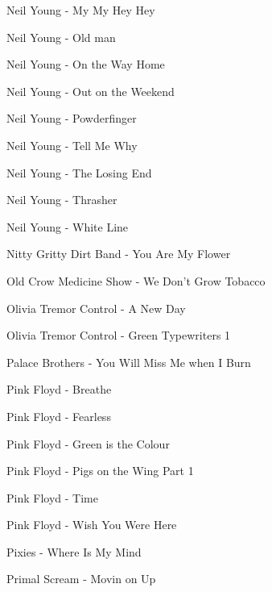 Neil Young - My My Hey Hey \dotfill \pageref{My My Hey Hey - Neil Young} 

Neil Young - Old man \dotfill \pageref{Old man - Neil Young} 

Neil Young - On the Way Home \dotfill \pageref{On the Way Home - Neil Young} 

Neil Young - Out on the Weekend \dotfill \pageref{Out on the Weekend - Neil Young} 

Neil Young - Powderfinger \dotfill \pageref{Powderfinger - Neil Young} 

Neil Young - Tell Me Why \dotfill \pageref{Tell Me Why - Neil Young} 

Neil Young - The Losing End \dotfill \pageref{The Losing End - Neil Young} 

Neil Young - Thrasher \dotfill \pageref{Thrasher - Neil Young} 

Neil Young - White Line \dotfill \pageref{White Line - Neil Young} 

Nitty Gritty Dirt Band - You Are My Flower \dotfill \pageref{You Are My Flower - Nitty Gritty Dirt Band} 

Old Crow Medicine Show - We Don't Grow Tobacco \dotfill \pageref{We Don't Grow Tobacco - Old Crow Medicine Show} 

Olivia Tremor Control - A New Day \dotfill \pageref{A New Day - Olivia Tremor Control} 

Olivia Tremor Control - Green Typewriters 1 \dotfill \pageref{Green Typewriters 1 - Olivia Tremor Control} 

Palace Brothers - You Will Miss Me when I Burn \dotfill \pageref{You Will Miss Me when I Burn - Palace Brothers} 

Pink Floyd - Breathe \dotfill \pageref{Breathe - Pink Floyd} 

Pink Floyd - Fearless \dotfill \pageref{Fearless - Pink Floyd} 

Pink Floyd - Green is the Colour \dotfill \pageref{Green is the Colour - Pink Floyd} 

Pink Floyd - Pigs on the Wing Part 1 \dotfill \pageref{Pigs on the Wing Part 1 - Pink Floyd} 

Pink Floyd - Time \dotfill \pageref{Time - Pink Floyd} 

Pink Floyd - Wish You Were Here \dotfill \pageref{Wish You Were Here - Pink Floyd} 

Pixies - Where Is My Mind \dotfill \pageref{Where Is My Mind - Pixies} 

Primal Scream - Movin on Up \dotfill \pageref{Movin on Up - Primal Scream} 

